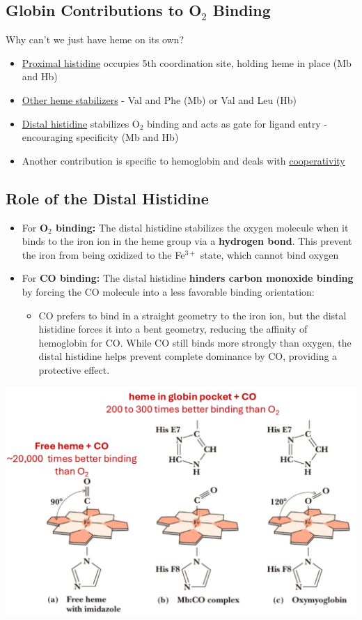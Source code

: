 \documentclass[10pt]{article}
\begin{document}
\subsection*{Globin Contributions to O$_2$ Binding}
Why can't we just have heme on its own?
\begin{itemize}
    \item \underline{Proximal histidine} occupies 5th coordination site, holding heme in place (Mb and Hb)
    \item \underline{Other heme stabilizers} - Val and Phe (Mb) or Val and Leu (Hb)
    \item \underline{Distal histidine} stabilizes O$_2$ binding and acts as gate for ligand entry - encouraging specificity (Mb and Hb)
    \item Another contribution is specific to hemoglobin and deals with \underline{cooperativity}
\end{itemize}

\subsection*{Role of the Distal Histidine}
\begin{itemize}
    \item For \textbf{O$_2$ binding:} The distal histidine stabilizes the oxygen molecule when it binds to the iron ion in the heme group via a \textbf{hydrogen bond}.  This prevent the iron from being oxidized to the Fe$^{3+}$ state, which cannot bind oxygen
    \item For \textbf{CO binding:} The distal histidine \textbf{hinders carbon monoxide binding} by forcing the CO molecule into a less favorable binding orientation:
    \begin{itemize}
        \item CO prefers to bind in a straight geometry to the iron ion, but the distal histidine forces it into a bent geometry, reducing the affinity of hemoglobin for CO.  While CO still binds more strongly than oxygen, the distal histidine helps prevent complete dominance by CO, providing a protective effect.
    \end{itemize}
\end{itemize}
\begin{center}
    \includegraphics*[width=\textwidth]{L2_4.png}
\end{center}
\end{document}
